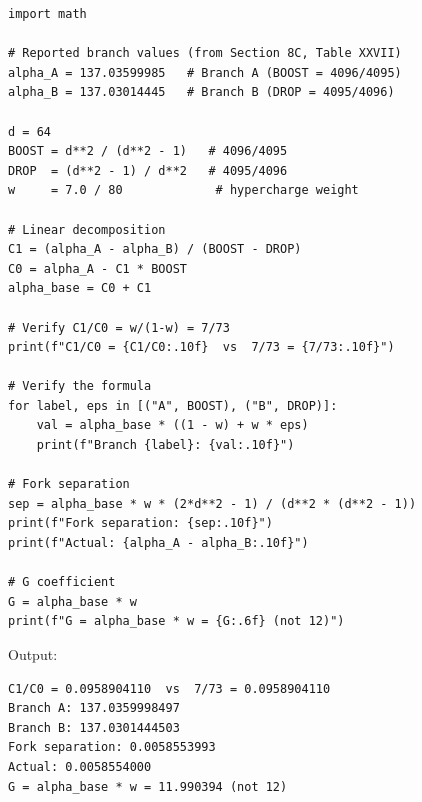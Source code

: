 \documentclass[12pt,a4paper]{article}
\begin{document}
\begin{verbatim}
import math

# Reported branch values (from Section 8C, Table XXVII)
alpha_A = 137.03599985   # Branch A (BOOST = 4096/4095)
alpha_B = 137.03014445   # Branch B (DROP = 4095/4096)

d = 64
BOOST = d**2 / (d**2 - 1)   # 4096/4095
DROP  = (d**2 - 1) / d**2   # 4095/4096
w     = 7.0 / 80             # hypercharge weight

# Linear decomposition
C1 = (alpha_A - alpha_B) / (BOOST - DROP)
C0 = alpha_A - C1 * BOOST
alpha_base = C0 + C1

# Verify C1/C0 = w/(1-w) = 7/73
print(f"C1/C0 = {C1/C0:.10f}  vs  7/73 = {7/73:.10f}")

# Verify the formula
for label, eps in [("A", BOOST), ("B", DROP)]:
    val = alpha_base * ((1 - w) + w * eps)
    print(f"Branch {label}: {val:.10f}")

# Fork separation
sep = alpha_base * w * (2*d**2 - 1) / (d**2 * (d**2 - 1))
print(f"Fork separation: {sep:.10f}")
print(f"Actual: {alpha_A - alpha_B:.10f}")

# G coefficient
G = alpha_base * w
print(f"G = alpha_base * w = {G:.6f} (not 12)")
\end{verbatim}

Output:
\begin{verbatim}
C1/C0 = 0.0958904110  vs  7/73 = 0.0958904110
Branch A: 137.0359998497
Branch B: 137.0301444503
Fork separation: 0.0058553993
Actual: 0.0058554000
G = alpha_base * w = 11.990394 (not 12)
\end{verbatim}
\end{document}
